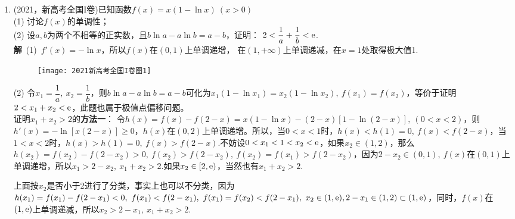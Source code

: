 \begin{enumerate}[label={【\textbf{例\thechapter.\arabic*}】},
 leftmargin=\inteval{\myenumleftmargin}pt,
 itemsep=\inteval{\myenumitempsep}pt,
 itemindent=\inteval{\myenumitemindent}pt]
令$ \varphi(x)=x^{\frac{1}{x-1}}\ (x>1) $，
$ \ln\varphi(x)=\dfrac{\ln x}{x-1} $，两边求导，
\begin{gather*}
    \frac{\varphi'(x)}{\varphi(x)}=
    \dfrac{1-\frac{1}{x}-\ln x}{(x-1)^2},\q 
    \varphi'(x)=x^{\frac{1}{x-1}} 
    \dfrac{1-\frac{1}{x}-\ln x}{(x-1)^2} 
\end{gather*}
容易证明，$ \dfrac{1}{x}+\ln x $在$ (0,+\infty) $上的极小值是1(当$ x=1 $)，
所以，$ \varphi'(x)<0 $，$ \varphi(x) $在
$ (1,+\infty) $上单调递减。$ n\geq 2,\ x_0=\varphi(n)\leq 
\varphi(2)=2 $. 另外，$ \lim\limits_{n\to+\infty}n^{\frac{1}{n-1}}=1 $.\\
\textbf{注2}：请读者自行证明：当$ n\geq 3 $时，$ x_0<x_1+x_2<2 $. \\
提示：要证$ x_1+x_2<2 $，只需证$ x>1 $时，$ f(x)<f(2-x) $；
要证$ 0<x_1+x_2 $，可考虑抛物线$ y=\dfrac{n-1}{x_0-1}x(x_0-x) $，
这条抛物线过原点、$ P(x_0,0) $点和$ f(x) $的极大值点$ (1,n-1) $.

\item (2021，新高考全国I卷)已知函数$ f(x)=x(1-\ln x)\ (x>0) $ \\
(1) 讨论$ f(x) $的单调性；\\
(2) 设$ a,b $为两个不相等的正实数，且$ b\ln a-a\ln b=a-b $，证明：
$ 2< \dfrac{1}{a}+\dfrac{1}{b}<\mathrm{e} $.\\
\textbf{解}\ (1)\ $ f'(x)=-\ln x $，所以$ f(x) $在$ (0,1) $上单调递增，
在$ (1,+\infty) $上单调递减，在$ x=1 $处取得极大值1.
\begin{figure}[H]
	\centering
	\texttt{[image: 2021新高考全国I卷图1]}
\end{figure} 
\noindent (2) 令$ x_1=\dfrac{1}{a},\ x_2=\dfrac{1}{b} $，则$ b\ln a-a\ln b=a-b $可化为$ x_1(1-\ln x_1)=x_2(1-\ln x_2),\ f(x_1)=f(x_2) $，等价于证明$ 2<x_1+x_2<\mathrm{e} $，此题也属于极值点偏移问题。\\
证明$ x_1+x_2>2 $的\textbf{方法一}：
令$ h(x)=f(x)-f(2-x)=x(1-\ln x)-(2-x)[1-\ln(2-x)],\ (0<x<2) $，则$ h'(x)=-\ln[x(2-x)]\geq 0 $，$ h(x) $在$ (0,2) $上单调递增。所以，当$ 0<x<1 $时，$ h(x)<h(1)=0,\ f(x)<f(2-x) $，当$ 1<x<2 $时，$ h(x)>h(1)=0,\ f(x)>f(2-x) $.不妨设$ 0<x_1<1<x_2<\mathrm{e} $，如果$ x_2\in(1,2) $，那么$ h(x_2)=f(x_2)-f(2-x_2)>0,\ f(x_2)>f(2-x_2),\ f(x_2)=f(x_1)>f(2-x_2) $，因为$ 2-x_2\in(0,1),\  f(x) $在$ (0,1) $上单调递增，所以$ x_1>2-x_2,\ x_1+x_2 >2 $.如果$ x_2\in[2,\mathrm{e}) $，当然也有$ x_1+x_2 >2 $.

上面按$ x_2 $是否小于2进行了分类，事实上也可以不分类，因为
$ h(x_1)=f(x_1)-f(2-x_1)<0,\ f(x_1)<f(2-x_1),\ f(x_1)=f(x_2)<f(2-x_1),\ x_2\in (1,\e), 2-x_1\in (1,2)\subset(1,\e) $，同时，$ f(x) $在$ (1,\mathrm{e}) $上单调递减，所以$ x_2>2-x_1,\ x_1+x_2 >2 $.


\end{enumerate}
